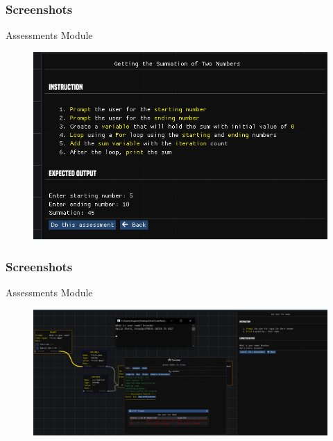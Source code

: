 \documentclass{beamer}
\begin{document}
\begin{frame}
	\frametitle{Screenshots}
	\begin{block}{Assessments Module}
		\begin{figure}
				\includegraphics[width=1\textwidth]{../tex/media/sc_assessments_sample.png}
		\end{figure}
	\end{block}
\end{frame}

\begin{frame}
	\frametitle{Screenshots}
	\begin{block}{Assessments Module}
		\begin{figure}
				\includegraphics[width=1\textwidth]{../tex/media/sc_assessments_run.png}
		\end{figure}
	\end{block}
\end{frame}
\end{document}
